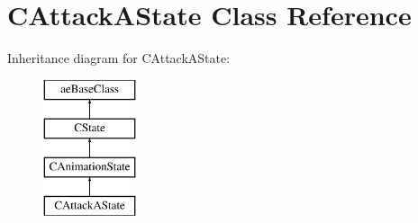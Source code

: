 \hypertarget{class_c_attack_a_state}{}\section{C\+Attack\+A\+State Class Reference}
\label{class_c_attack_a_state}
Inheritance diagram for C\+Attack\+A\+State\+:\begin{figure}[H]
\begin{center}
\leavevmode
\includegraphics[height=4.000000cm]{class_c_attack_a_state}
\end{center}
\end{figure}
